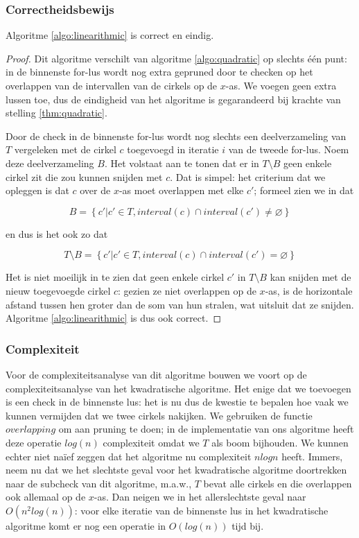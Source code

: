 \subsubsection{Correctheidsbewijs}
\begin{stl} Algoritme \ref{algo:linearithmic} is correct en eindig.\end{stl}
\begin{proof}
Dit algoritme verschilt van algoritme \ref{algo:quadratic} op slechts
één punt: in de binnenste for-lus wordt nog extra gepruned door te
checken op het overlappen van de intervallen van de cirkels op de
$x$-as. We voegen geen extra lussen toe, dus de eindigheid van het
algoritme is gegarandeerd bij krachte van stelling
\ref{thm:quadratic}.

Door de check in de binnenste for-lus wordt nog slechts een
deelverzameling van $T$ vergeleken met de cirkel $c$ toegevoegd in
iteratie $i$ van de tweede for-lus. Noem deze deelverzameling $B$. Het
volstaat aan te tonen dat er in $T \setminus B$ geen enkele cirkel zit die zou
kunnen snijden met $c$. Dat is simpel: het criterium dat we opleggen
is dat $c$ over de $x$-as moet overlappen met elke $c'$; formeel zien
we in dat 

\[B = \left\{c' | c' \in T, interval(c) \cap interval(c') \neq \varnothing \right\} \]

en dus is het ook zo dat

\[T \setminus B = \left\{c' | c' \in T, interval(c) \cap interval(c') = \varnothing \right\} \]

Het is niet moeilijk in te zien dat geen enkele cirkel $c'$ in $T
\setminus B$ kan snijden met de nieuw toegevoegde cirkel $c$: gezien
ze niet overlappen op de $x$-as, is de horizontale afstand tussen hen
groter dan de som van hun stralen, wat uitsluit dat ze
snijden. Algoritme \ref{algo:linearithmic} is dus ook correct.
\end{proof}

\subsubsection{Complexiteit}
Voor de complexiteitsanalyse van dit algoritme bouwen we voort op de
complexiteitsanalyse van het kwadratische algoritme. Het enige dat we
toevoegen is een check in de binnenste lus: het is nu dus de kwestie
te bepalen hoe vaak we kunnen vermijden dat we twee cirkels
nakijken. We gebruiken de functie $overlapping$ om aan pruning te
doen; in de implementatie van ons algoritme heeft deze operatie
$log(n)$ complexiteit omdat we $T$ als boom bijhouden. We kunnen
echter niet na\"ief zeggen dat het algoritme nu complexiteit $nlogn$
heeft. Immers, neem nu dat we het slechtste geval voor het
kwadratische algoritme doortrekken naar de subcheck van dit algoritme,
m.a.w., $T$ bevat alle cirkels en die overlappen ook allemaal op de
$x$-as. Dan neigen we in het allerslechtste geval naar $O(n^2
log(n))$: voor elke iteratie van de binnenste lus in het kwadratische
algoritme komt er nog een operatie in $O(log(n))$ tijd bij.

